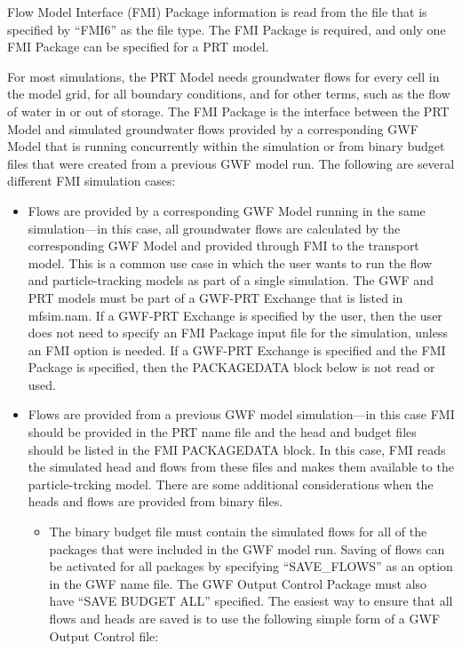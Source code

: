 Flow Model Interface (FMI) Package information is read from the file that is specified by ``FMI6'' as the file type.  The FMI Package is required, and only one FMI Package can be specified for a PRT model.

For most simulations, the PRT Model needs groundwater flows for every cell in the model grid, for all boundary conditions, and for other terms, such as the flow of water in or out of storage.  The FMI Package is the interface between the PRT Model and simulated groundwater flows provided by a corresponding GWF Model that is running concurrently within the simulation or from binary budget files that were created from a previous GWF model run.  The following are several different FMI simulation cases:

\begin{itemize}

\item Flows are provided by a corresponding GWF Model running in the same simulation---in this case, all groundwater flows are calculated by the corresponding GWF Model and provided through FMI to the transport model.  This is a common use case in which the user wants to run the flow and particle-tracking models as part of a single simulation.  The GWF and PRT models must be part of a GWF-PRT Exchange that is listed in mfsim.nam.  If a GWF-PRT Exchange is specified by the user, then the user does not need to specify an FMI Package input file for the simulation, unless an FMI option is needed.  If a GWF-PRT Exchange is specified and the FMI Package is specified, then the PACKAGEDATA block below is not read or used.

\item Flows are provided from a previous GWF model simulation---in this case FMI should be provided in the PRT name file and the head and budget files should be listed in the FMI PACKAGEDATA block.  In this case, FMI reads the simulated head and flows from these files and makes them available to the particle-trcking model.  There are some additional considerations when the heads and flows are provided from binary files.

\begin{itemize}
\item The binary budget file must contain the simulated flows for all of the packages that were included in the GWF model run.  Saving of flows can be activated for all packages by specifying ``SAVE\_FLOWS'' as an option in the GWF name file.  The GWF Output Control Package must also have ``SAVE BUDGET ALL'' specified.  The easiest way to ensure that all flows and heads are saved is to use the following simple form of a GWF Output Control file:


\end{itemize}
\end{itemize}
